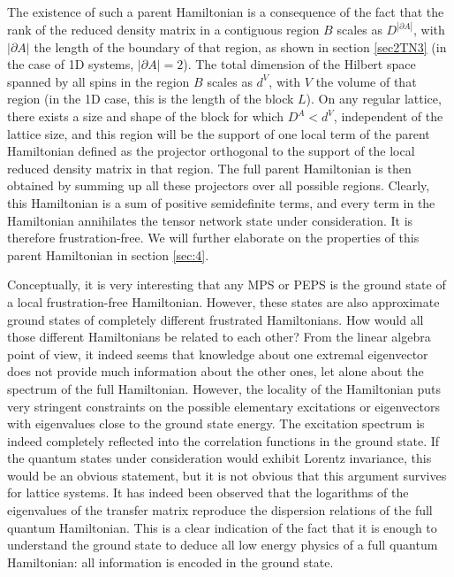\documentclass[rmp,aps,reprint,superscriptaddress,nobalancelastpage]{revtex4-1}
\begin{document}
The existence of such a parent Hamiltonian is a consequence of the fact that the rank of the reduced density matrix in a contiguous region $B$ scales as $D^{|\partial A|}$, with $|\partial A|$ the length of the boundary of that region, as shown in section \ref{sec2TN3} (in the case of 1D systems, $|\partial A|=2$). The total dimension of the Hilbert space spanned by all spins in the region $B$ scales as $d^V$, with $V$ the volume of that region (in the 1D case, this is the length of the block $L$). On any regular lattice, there exists a size and shape of the block for which $D^A<d^V$, independent of the lattice size,  and this region will be the support of one local term of the parent Hamiltonian defined as the projector orthogonal to the support of the local reduced density matrix in that region. The full parent Hamiltonian is then obtained by summing up all these projectors over all possible regions. Clearly, this Hamiltonian is a sum of positive semidefinite terms, and every term in the Hamiltonian annihilates the tensor network state under consideration. It is therefore frustration-free. We will further elaborate on the properties of this  parent Hamiltonian in section \ref{sec:4}.

Conceptually, it is very interesting that any MPS or PEPS is the ground state of a local frustration-free Hamiltonian. However, these states are also approximate ground states of completely different frustrated Hamiltonians. How would all those different Hamiltonians be related to each other? From the linear algebra point of view, it indeed seems that knowledge about one extremal eigenvector does not provide much information about the other ones, let alone about the spectrum of the full Hamiltonian. However, the locality of the Hamiltonian puts very stringent constraints on the possible elementary excitations or eigenvectors with eigenvalues close to the ground state energy. The excitation spectrum is indeed completely reflected into the correlation functions in the ground state. If the quantum states under consideration would exhibit Lorentz invariance, this would be an obvious statement, but it is not obvious that this argument survives for lattice systems. It has indeed been observed \cite{zauner:tm-dispersion,haegeman:shadows} that the logarithms of the eigenvalues of the transfer matrix reproduce the dispersion relations of the full quantum Hamiltonian. This is a clear indication of the fact that it is enough to understand the ground state to deduce all low energy physics of a full quantum Hamiltonian: all information is encoded in the ground state.
\end{document}
